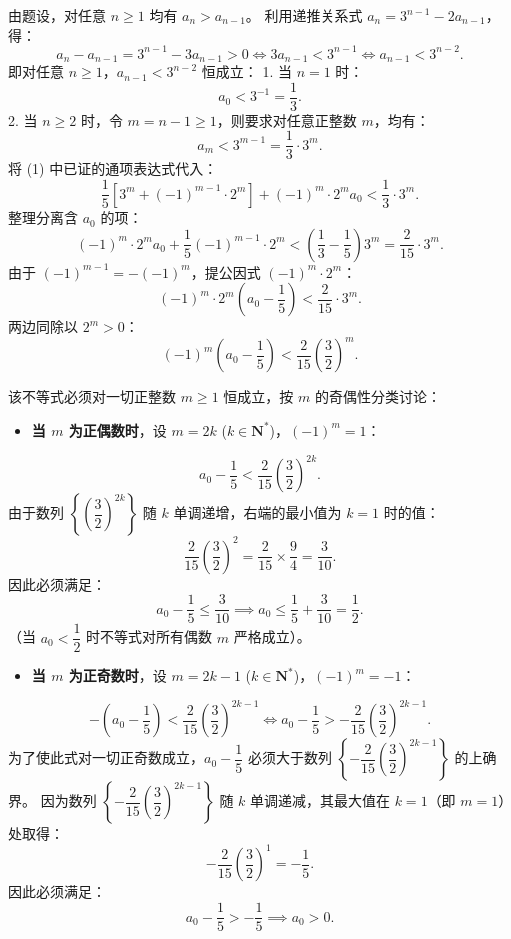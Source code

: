 \begin{answer}
由题设，对任意 $n \ge 1$ 均有 $a_n > a_{n-1}$。
利用递推关系式 $a_n = 3^{n-1} - 2a_{n-1}$，得：
\nopagebreak[4]
\[a_n - a_{n-1} = 3^{n-1} - 3a_{n-1} > 0 \iff 3a_{n-1} < 3^{n-1} \iff a_{n-1} < 3^{n-2}.\]
即对任意 $n \ge 1$，$a_{n-1} < 3^{n-2}$ 恒成立：
1. 当 $n = 1$ 时：
\nopagebreak[4]
\[a_0 < 3^{-1} = \frac{1}{3}.\]
2. 当 $n \ge 2$ 时，令 $m = n - 1 \ge 1$，则要求对任意正整数 $m$，均有：
\nopagebreak[4]
\[a_m < 3^{m-1} = \frac{1}{3} \cdot 3^m.\]
   将 (1) 中已证的通项表达式代入：
\nopagebreak[4]
\[\frac{1}{5}[3^m + (-1)^{m-1} \cdot 2^m] + (-1)^m \cdot 2^m a_0 < \frac{1}{3} \cdot 3^m.\]
   整理分离含 $a_0$ 的项：
\nopagebreak[4]
\[(-1)^m \cdot 2^m a_0 + \frac{1}{5}(-1)^{m-1} \cdot 2^m < \left(\frac{1}{3} - \frac{1}{5}\right) 3^m = \frac{2}{15} \cdot 3^m.\]
   由于 $(-1)^{m-1} = -(-1)^m$，提公因式 $(-1)^m \cdot 2^m$：
\nopagebreak[4]
\[(-1)^m \cdot 2^m \left(a_0 - \frac{1}{5}\right) < \frac{2}{15} \cdot 3^m.\]
   两边同除以 $2^m > 0$：
\nopagebreak[4]
\[(-1)^m \left(a_0 - \frac{1}{5}\right) < \frac{2}{15} \left(\frac{3}{2}\right)^m.\]

该不等式必须对一切正整数 $m \ge 1$ 恒成立，按 $m$ 的奇偶性分类讨论：
\begin{itemize}
\item \textbf{当 $m$ 为正偶数时}，设 $m = 2k$ ($k \in \mathbf{N}^*$)，$(-1)^m = 1$：
\end{itemize}
\nopagebreak[4]
\[a_0 - \frac{1}{5} < \frac{2}{15} \left(\frac{3}{2}\right)^{2k}.\]
  由于数列 $\left\{\left(\dfrac{3}{2}\right)^{2k}\right\}$ 随 $k$ 单调递增，右端的最小值为 $k = 1$ 时的值：
\nopagebreak[4]
\[\frac{2}{15} \left(\frac{3}{2}\right)^2 = \frac{2}{15} \times \frac{9}{4} = \frac{3}{10}.\]
  因此必须满足：
\nopagebreak[4]
\[a_0 - \frac{1}{5} \le \frac{3}{10} \implies a_0 \le \frac{1}{5} + \frac{3}{10} = \frac{1}{2}.\]
  （当 $a_0 < \dfrac{1}{2}$ 时不等式对所有偶数 $m$ 严格成立）。
\begin{itemize}
\item \textbf{当 $m$ 为正奇数时}，设 $m = 2k - 1$ ($k \in \mathbf{N}^*$)，$(-1)^m = -1$：
\end{itemize}
\nopagebreak[4]
\[-\left(a_0 - \frac{1}{5}\right) < \frac{2}{15} \left(\frac{3}{2}\right)^{2k-1} \iff a_0 - \frac{1}{5} > -\frac{2}{15} \left(\frac{3}{2}\right)^{2k-1}.\]
  为了使此式对一切正奇数成立，$a_0 - \dfrac{1}{5}$ 必须大于数列 $\left\{-\dfrac{2}{15}\left(\dfrac{3}{2}\right)^{2k-1}\right\}$ 的上确界。
  因为数列 $\left\{-\dfrac{2}{15}\left(\dfrac{3}{2}\right)^{2k-1}\right\}$ 随 $k$ 单调递减，其最大值在 $k = 1$（即 $m = 1$）处取得：
\nopagebreak[4]
\[-\frac{2}{15} \left(\frac{3}{2}\right)^1 = -\frac{1}{5}.\]
  因此必须满足：
\nopagebreak[4]
\[a_0 - \frac{1}{5} > -\frac{1}{5} \implies a_0 > 0.\]


\end{answer}
